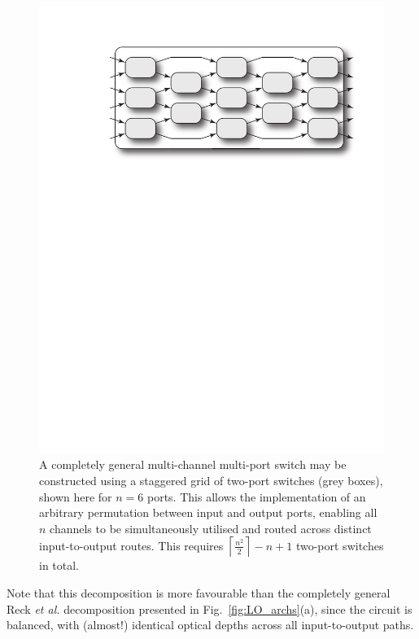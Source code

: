 \documentclass[aps, rmp, twocolumn, amsmath, amssymb, nofootinbib, superscriptaddress, longbibliography, floatfix, table-of-contents, eqsecnum]{revtex4-1}
\begin{document}
\begin{figure}[!htb]
\includegraphics[width=\columnwidth]{multi_channel_multi_port_switch}
\caption{A completely general multi-channel multi-port switch may be constructed using a staggered grid of two-port switches (grey boxes), shown here for \mbox{$n=6$} ports. This allows the implementation of an arbitrary permutation between input and output ports, enabling all $n$ channels to be simultaneously utilised and routed across distinct input-to-output routes. This requires \mbox{$\left\lceil \frac{n^2}{2}\right\rceil - n + 1$} two-port switches in total.} \label{fig:multi_channel_multi_port_switch} 	
\end{figure}

Note that this decomposition is more favourable than the completely general Reck \textit{et al.} decomposition presented in Fig.~\ref{fig:LO_archs}(a), since the circuit is balanced, with (almost!) identical optical depths across all input-to-output paths.
\end{document}
